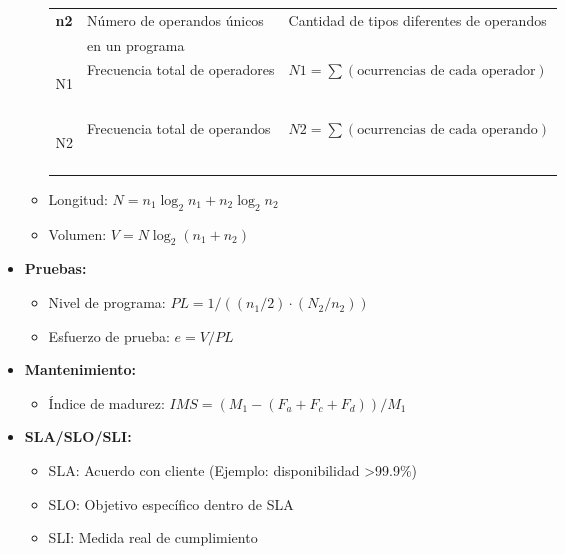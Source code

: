 \begin{itemize}
\begin{itemize}
\begin{table}[!ht]
\begin{tabular}{>{\bfseries}l l l}
                    n2 & Número de operandos únicos     & Cantidad de tipos diferentes de operandos         \\
                    & en un programa                 &                                                   \\
                    \addlinespace

                    N1 & Frecuencia total de operadores & $N1 = \sum (\text{ocurrencias de cada operador})$ \\
                    &                                &                                                   \\
                    \addlinespace

                    N2 & Frecuencia total de operandos  & $N2 = \sum (\text{ocurrencias de cada operando})$ \\
                    &                                &                                                   \\
                    \bottomrule
                \end{tabular}
            \end{table}

            \item Longitud: $N = n_1 \log_2 n_1 + n_2 \log_2 n_2$
            \item Volumen: $V = N \log_2 (n_1 + n_2)$
        \end{itemize}

        \item \textbf{Pruebas:}
        \begin{itemize}
            \item Nivel de programa: $PL = 1 / ((n_1/2) \cdot (N_2/n_2))$
            \item Esfuerzo de prueba: $e = V / PL$
        \end{itemize}

        \item \textbf{Mantenimiento:}
        \begin{itemize}
            \item Índice de madurez: $IMS = (M_1 - (F_a + F_c + F_d)) / M_1$
        \end{itemize}

        \item \textbf{SLA/SLO/SLI:}
        \begin{itemize}
            \item SLA: Acuerdo con cliente (Ejemplo: disponibilidad >99.9\%)
            \item SLO: Objetivo específico dentro de SLA
            \item SLI: Medida real de cumplimiento
        \end{itemize}
    \end{itemize}

